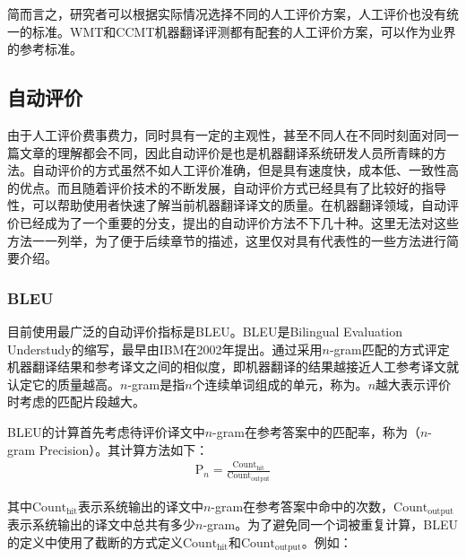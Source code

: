 \parinterval 简而言之，研究者可以根据实际情况选择不同的人工评价方案，人工评价也没有统一的标准。WMT和CCMT机器翻译评测都有配套的人工评价方案，可以作为业界的参考标准。


\subsection{自动评价}

\parinterval 由于人工评价费事费力，同时具有一定的主观性，甚至不同人在不同时刻面对同一篇文章的理解都会不同，因此自动评价是也是机器翻译系统研发人员所青睐的方法。自动评价的方式虽然不如人工评价准确，但是具有速度快，成本低、一致性高的优点。而且随着评价技术的不断发展，自动评价方式已经具有了比较好的指导性，可以帮助使用者快速了解当前机器翻译译文的质量。在机器翻译领域，自动评价已经成为了一个重要的分支，提出的自动评价方法不下几十种。这里无法对这些方法一一列举，为了便于后续章节的描述，这里仅对具有代表性的一些方法进行简要介绍。


\subsubsection{BLEU}

\parinterval 目前使用最广泛的自动评价指标是BLEU。BLEU是Bilingual Evaluation Understudy的缩写，最早由IBM在2002年提出\cite{papineni2002bleu}。通过采用$n$-gram匹配的方式评定机器翻译结果和参考译文之间的相似度，即机器翻译的结果越接近人工参考译文就认定它的质量越高。$n$-gram是指$n$个连续单词组成的单元，称为{\small{}}。$n$越大表示评价时考虑的匹配片段越大。

\parinterval  BLEU的计算首先考虑待评价译文中$n$-gram在参考答案中的匹配率，称为{\small{}}（$n$-gram Precision）。其计算方法如下：
\begin{eqnarray}
\textrm{P}_n=\frac{\textrm{Count}_\textrm{hit}}{\textrm{Count}_{\textrm{output}}}
\label{eq:1-1}
\end{eqnarray}

\parinterval  其中$\textrm{Count}_{\textrm{hit}}$表示系统输出的译文中$n$-gram在参考答案中命中的次数，$\textrm{Count}_{\textrm{output}}$\\表示系统输出的译文中总共有多少$n$-gram。为了避免同一个词被重复计算，BLEU的定义中使用了截断的方式定义$\textrm{Count}_{\textrm{hit}}$和$\textrm{Count}_{\textrm{output}}$。例如：

